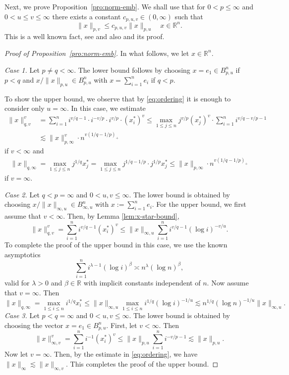 \documentclass[a4paper,12pt]{article}
\theoremstyle{definition}
\newcommand{\IR}{\mathbb{R}}
\begin{document}
Next, we prove Proposition~\ref{pro:norm-emb}.
We shall use that for $0<p\le \infty$ and $0<u\le v\le \infty$ there exists a constant $c_{p,u,v}\in(0,\infty)$ such that 
\begin{equation} \label{eq:ordering}
\|x\|_{p,v}\le c_{p,u,v}\|x\|_{p,u}\quad x\in\IR^n.
\end{equation}
This is a well known fact, see \cite[Proposition 4.2]{BS88} and also \cite[Proposition 6]{DV20} and its proof.

\begin{proof}[Proof of Proposition~\ref{pro:norm-emb}]
In what follows, we let $x\in \IR^n$.
\vskip 2mm

\noindent\emph{Case 1.} Let $p\not=q<\infty$. The lower bound follows by choosing $x=e_1\in B^n_{p,u}$ if $p<q$ and 
$x/\|x\|_{p,u}\in B^n_{p,u}$ with $x=\sum_{i=1}^n e_i$ if $q<p.$

To show the upper bound, we observe that by \eqref{eq:ordering} it is enough to consider only $u=\infty.$ In this case, we estimate
\begin{align*}
\|x\|_{q,v}^v&=\sum_{i=1}^n i^{v/q-1}\cdot i^{-v/p} \cdot i^{v/p}\cdot (x_i^*)^v\le \max_{1\le j\le n} j^{v/p} (x_j^*)^v\cdot \sum_{i=1}^n i^{v/q-v/p-1}\\
&\lesssim \|x\|_{p,\infty}^v\cdot n^{v(1/q-1/p)_+}
\end{align*}
if $v<\infty$ and
\begin{align*}
\|x\|_{q,\infty}=\max_{1\le j\le n} j^{1/q}x_j^* = \max_{1\le j\le n} j^{1/q-1/p}\cdot j^{1/p}x_j^*\le \|x\|_{p,\infty}\cdot n^{v(1/q-1/p)_+}
\end{align*}
if $v=\infty.$


\vskip 2mm
\noindent\emph{Case 2.} Let $q<p=\infty$ and $0<u,v\le \infty$. The lower bound is obtained by choosing $x/\|x\|_{\infty,u}\in B_{\infty,u}^n$ with $x:=\sum_{i=1}^{n}e_i$. For the upper bound, we first assume that $v<\infty$.
Then, by Lemma \ref{lem:x-star-bound},
\[
\|x\|_{q,v}^v
=\sum_{i=1}^{n}i^{v/q-1}(x_i^*)^v
\le \|x\|_{\infty,u}\sum_{i=1}^{n}i^{v/q-1}(\log i)^{-v/u}.
\]
To complete the proof of the upper bound in this case, we use the known asymptotics
\[
\sum_{i=1}^{n}i^{\lambda-1}(\log i)^{\beta}
\asymp n^{\lambda}(\log n)^{\beta},
\]
valid for $\lambda>0$ and $\beta\in \IR$ with implicit constants independent of $n$. Now assume that $v=\infty$. Then
\[
\|x\|_{q,\infty}
=\max_{1\le i\le n}i^{1/q}x_i^*
\le \|x\|_{\infty,u}\max_{1\le i\le n}i^{1/q}(\log i)^{-1/u}
\lesssim n^{1/q}(\log n)^{-1/u}\|x\|_{\infty,u}.
\]
\vskip 2mm
\noindent\emph{Case 3.} Let $p<q=\infty$ and $0<u,v\le \infty$. The lower bound is obtained by choosing the vector $x=e_1\in B_{p,u}^n$. First, let $v<\infty$. Then
\[
\|x\|_{\infty,v}^v
=\sum_{i=1}^{n}i^{-1}(x_i^*)^v
\le \|x\|_{p,u}\sum_{i=1}^{n}i^{-v/p-1}
\lesssim \|x\|_{p,u}.
\]
Now let $v=\infty$. Then, by the estimate in \eqref{eq:ordering}, we have $\|x\|_{\infty}\lesssim \|x\|_{\infty,v}$. This completes the proof of the upper bound.


\end{proof}
\end{document}
